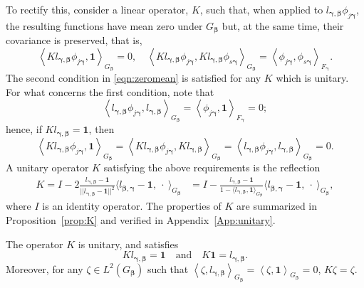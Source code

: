 \documentclass[11pt]{article}
\newcommand{\vect}[1]{\boldsymbol{#1}}
\newcommand{\inner}[1]{\left\langle #1 \right\rangle}
\newcommand{\phj}{\phi_{j\vect{\gamma}}}
\newcommand{\phs}{\phi_{s\vect{\gamma}}}
\begin{document}
To rectify this, consider a linear operator, $K$, such that, when applied to $l_{\vect{\gamma},\vect{\beta}}\phj$, the resulting functions have mean zero under $G_{\vect{\beta}}$ but, at the same time, their covariance is preserved, that is, 
\begin{equation}
\label{eqn:zeromean}
\inner{K l_{\vect{\gamma},\vect{\beta}}\phj,\vect{1}}_{{G_{\vect{\beta}}}}= 0, \quad 
\inner{K l_{\vect{\gamma},\vect{\beta}}\phj,K l_{\vect{\gamma},\vect{\beta}}\phs}_{{G_{\vect{\beta}}}}=\inner{\phj,\phs}_{{F_{\vect{\gamma}}}}. 
\end{equation}
The second condition in \eqref{eqn:zeromean} is satisfied for any  $K$ which is unitary. For what concerns the first condition, note that 
$$\inner{l_{\vect{\gamma},\vect{\beta}}\phj,l_{\vect{\gamma},\vect{\beta}}}_{{G_{\vect{\beta}}}}=\inner{\phj,\vect{1}}_{{F_{\vect{\gamma}}}} = 0;$$
hence, if  $Kl_{\vect{\gamma},\vect{\beta}}=\vect{1}$, then
$$\inner{K l_{\vect{\gamma},\vect{\beta}}\phj,\vect{1}}_{{G_{\vect{\beta}}}}= \inner{K l_{\vect{\gamma},\vect{\beta}}\phj,Kl_{\vect{\gamma},\vect{\beta}}}_{{G_{\vect{\beta}}}}= \inner{ l_{\vect{\gamma},\vect{\beta}}\phj,l_{\vect{\gamma},\vect{\beta}}}_{{G_{\vect{\beta}}}}=0.$$
A unitary operator $K$ satisfying the above requirements is the reflection
\begin{equation}
\begin{aligned}
K= I- 2\frac{l_{\vect{\gamma},\vect{\beta}}-\vect{1}}{||l_{\vect{\gamma},\vect{\beta}}-\vect{1}||^2}\langle l_{\vect{\beta} ,\vect{\gamma}}-\vect{1}, \ \cdot \ \rangle_{G_{\vect{\beta}}} 
&= I -\frac{l_{\vect{\gamma},\vect{\beta}}-\vect{1}}{1-\langle l_{\vect{\gamma},\vect{\beta}}, \vect{1}\rangle_{G_{\vect{\beta}}}}\langle l_{\vect{\beta} ,\vect{\gamma}}-\vect{1}, \ \cdot \ \rangle_{G_{\vect{\beta}}},
\label{eqn:Kop}
\end{aligned}
\end{equation}
where $I$ is an identity operator.
The properties of $K$ are summarized in Proposition~\ref{prop:K} and verified in Appendix~\ref{App:unitary}. 
\begin{prop}[\citealt{K22016}] 
\label{prop:K}
The operator $K$ is unitary, and satisfies $$ K l_{\vect{\gamma},\vect{\beta}}=\vect{1} \quad\text{and}\quad K \vect{1}=l_{\vect{\gamma},\vect{\beta}}.$$
Moreover, for any  $\zeta\in L^2(G_{\vect{\beta}})$ such that $\inner{\zeta, l_{\vect{\gamma},\vect{\beta}}}_{G_{\vect{\beta}}}=\inner{\zeta, \vect{1}}_{G_{\vect{\beta}}}=0$,  $K \zeta=\zeta.$  
\end{prop} 
\end{document}
